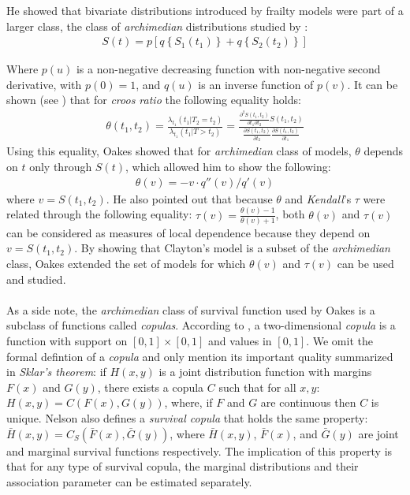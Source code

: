 \documentclass[]{article}
\begin{document}
He showed that bivariate distributions introduced by frailty models were part of a larger class, the class of \emph{archimedian} distributions studied by \cite{genest1986copules}:
$$
\begin{aligned}
	S(t) = p\left[ q\left\{ S_1(t_1) \right\}  + q\left\{ S_2(t_2) \right\}  \right]
\end{aligned}
$$

Where $p(u)$ is a non-negative decreasing function with non-negative second derivative, with $p(0)=1$, and $q(u)$ is an inverse function of $p(v)$. It can be shown (see ) that for \emph{croos ratio} the following equality holds:
	$$
	\begin{aligned}
		\theta(t_1,t_2) = \frac{\lambda_{t_1}(t_1|T_2=t_2)}{\lambda_{t_1}(t_1|T>t_2)} = \frac{ \frac{\partial^2 S(t_1,t_2)}{\partial t_1 \partial t_2} S(t_1, t_2)}    {\frac{\partial S(t_1, t_2)}{\partial t_2} \frac{\partial S(t_1, t_2)}{\partial t_1}}
	\end{aligned}
	$$
Using this equality, Oakes showed that for \emph{archimedian} class of models, $\theta$ depends on $t$ only through $S(t)$, which allowed him to show the following:
$$
\begin{aligned}
\theta(v) = -v\cdot q''(v)/q'(v)
\end{aligned}
$$
where $v=S(t_1, t_2)$. He also pointed out that because $\theta$ and \emph{Kendall}'s $\tau$ were related through the following equality: $\tau(v) = \frac{\theta(v)-1}{\theta(v)+1}$, both $\theta(v)$ and $\tau(v)$ can be considered as measures of local dependence because they depend on $v=S(t_1, t_2)$. By showing that Clayton's model is a subset of the \emph{archimedian} class, Oakes extended the set of models for which $\theta(v)$ and $\tau(v)$ can be used and studied.\\
~\\
As a side note, the \emph{archimedian} class of survival function used by Oakes is a subclass of functions called \emph{copulas}. According to \cite{nelsen2007introduction}, a two-dimensional \emph{copula} is a function with support on $[0, 1] \times [0, 1]$ and values in $[0, 1]$. We omit the formal defintion of a \emph{copula} and only mention its important quality summarized in \emph{Sklar's theorem}: if $H(x,y)$ is a joint distribution function with margins $F(x)$ and $G(y)$, there exists a copula $C$ such that for all $x,y$: $H(x,y) = C(F(x), G(y))$, where, if $F$ and $G$ are continuous then $C$ is unique. Nelson also defines a \emph{survival copula} that holds the same property: $\bar{H}(x,y) = C_S(\bar{F}(x), \bar{G}(y))$, where $\bar{H}(x,y)$, $\bar{F}(x)$, and $\bar{G}(y)$ are joint and marginal survival functions respectively. The implication of this property is that for any type of survival copula, the marginal distributions and their association parameter can be estimated separately. 
\end{document}
